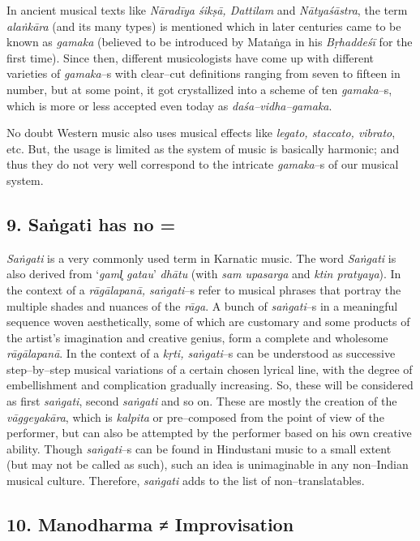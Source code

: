 In ancient musical texts like \textit{Nāradīya śikṣā, Dattilam} and \textit{Nātyaśāstra}, the term \textit{alaṅkāra} (and its many types) is mentioned which in later centuries came to be known as \textit{gamaka} (believed to be introduced by Mataṅga in his \textit{Bṛhaddeśī} for the first time). Since then, different musicologists have come up with different varieties of \textit{gamaka}–s with clear–cut definitions ranging from seven to fifteen in number, but at some point, it got crystallized into a scheme of ten \textit{gamaka}–s, which is more or less accepted even today as \textit{daśa–vidha–gamaka}.

No doubt Western music also uses musical effects like \textit{legato, staccato, vibrato}, etc. But, the usage is limited as the system of music is basically harmonic; and thus they do not very well correspond to the intricate \textit{gamaka}–s of our musical system.


\subsection*{9. Saṅgati has no =}

\textit{Saṅgati} is a very commonly used term in Karnatic music. The word \textit{Saṅgati} is also derived from ‘\textit{gaml̥ gatau}’ \textit{dhātu} (with \textit{sam upasarga} and \textit{ktin pratyaya}). In the context of a \textit{rāgālapanā, saṅgati}–s refer to musical phrases that portray the multiple shades and nuances of the \textit{rāga}. A bunch of \textit{saṅgati}–s in a meaningful sequence woven aesthetically, some of which are customary and some products of the artist’s imagination and creative genius, form a complete and wholesome \textit{rāgālapanā}. In the context of a \textit{kṛti, saṅgati}–s can be understood as successive step–by–step musical variations of a certain chosen lyrical line, with the degree of embellishment and complication gradually increasing. So, these will be considered as first \textit{saṅgati}, second \textit{saṅgati} and so on. These are mostly the creation of the \textit{vāggeyakāra}, which is \textit{kalpita} or pre–composed from the point of view of the performer, but can also be attempted by the performer based on his own creative ability. Though \textit{saṅgati}–s can be found in Hindustani music to a small extent (but may not be called as such), such an idea is unimaginable in any non–Indian musical culture. Therefore, \textit{saṅgati} adds to the list of non–translatables.


\subsection*{10. Manodharma ≠ Improvisation}

